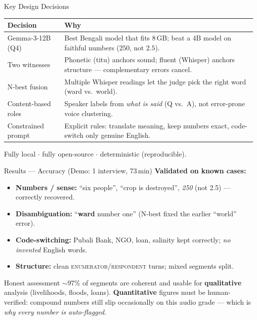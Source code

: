 \documentclass[aspectratio=169,10pt]{beamer}
\begin{document}
\begin{frame}{Key Design Decisions}
  \small
  \begin{table}
  \begin{tabular}{@{}p{} p{}@{}}
    \toprule
    \textbf{Decision} & \textbf{Why} \\
    \midrule
    Gemma-3-12B (Q4) & Best Bengali model that fits 8\,GB; beat a 4B
        model on faithful numbers ($250$, not $2.5$). \\
    Two witnesses & Phonetic (titu) anchors sound; fluent (Whisper) anchors
        structure --- complementary errors cancel. \\
    N-best fusion & Multiple Whisper readings let the judge pick the right
        word (ward vs.\ world). \\
    Content-based roles & Speaker labels from \emph{what is said} (Q vs.\ A),
        not error-prone voice clustering. \\
    Constrained prompt & Explicit rules: translate meaning, keep numbers
        exact, code-switch only genuine English. \\
    \bottomrule
  \end{tabular}
  \end{table}
  \centering\footnotesize
  Fully local $\cdot$ fully open-source $\cdot$ deterministic (reproducible).
\end{frame}

\begin{frame}{Results --- Accuracy (Demo: 1 interview, 73\,min)}
  \textbf{Validated on known cases:}
  \begin{itemize}\small
    \item \textbf{Numbers / sense:} ``six people'', ``crop is destroyed'',
          \emph{250} (not 2.5) --- correctly recovered.
    \item \textbf{Disambiguation:} ``\textbf{ward} number one'' (N-best fixed
          the earlier ``world'' error).
    \item \textbf{Code-switching:} Pubali Bank, NGO, loan, salinity kept
          correctly; \emph{no invented} English words.
    \item \textbf{Structure:} clean \textsc{enumerator}/\textsc{respondent}
          turns; mixed segments split.
  \end{itemize}
  \vspace{0.3em}
  \begin{block}{Honest assessment}
    \small
    $\sim$97\% of segments are coherent and usable for \textbf{qualitative}
    analysis (livelihoods, floods, loans). \textbf{Quantitative} figures
    must be human-verified: compound numbers still slip occasionally on this
    audio grade --- which is \emph{why every number is auto-flagged}.
  \end{block}
\end{frame}
\end{document}
